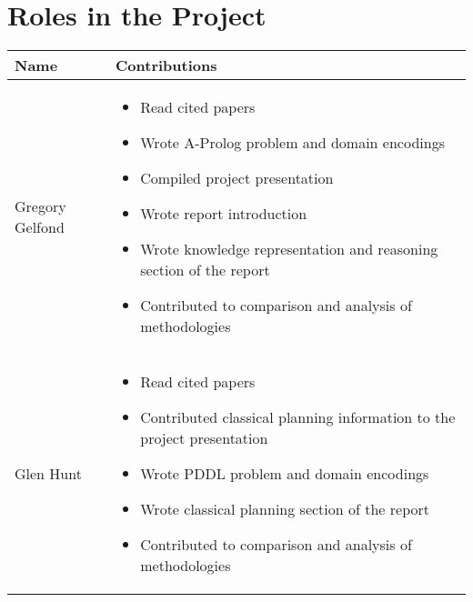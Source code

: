 \section*{Roles in the Project}
\begin{tabularx}{\textwidth}{lX}
    \textbf{Name} & \textbf{Contributions} \\ \toprule
    Gregory Gelfond & \begin{itemize}
        \item Read cited papers
        \item Wrote A-Prolog problem and domain encodings
        \item Compiled project presentation
        \item Wrote report introduction
        \item Wrote knowledge representation and reasoning section of the report
        \item Contributed to comparison and analysis of methodologies
    \end{itemize} \\ \midrule
    Glen Hunt & \begin{itemize}
        \item Read cited papers
        \item Contributed classical planning information to the project presentation
        \item Wrote PDDL problem and domain encodings
        \item Wrote classical planning section of the report
        \item Contributed to comparison and analysis of methodologies 
    \end{itemize} \\ 
\end{tabularx}